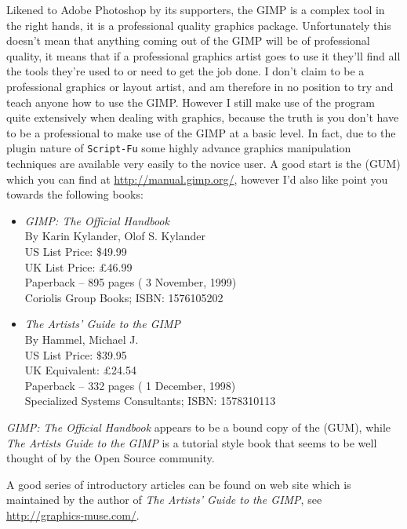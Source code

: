 \documentclass[twoside,11pt]{starlink}
\begin{document}
Likened to Adobe Photoshop by its supporters, the GIMP is a complex
tool in the right hands, it is a professional quality graphics
package. Unfortunately this doesn't mean that anything coming out of
the GIMP will be of professional quality, it means that if a
professional graphics artist goes to use it they'll find all the tools
they're used to or need to get the job done. I don't claim to be a
professional graphics or layout artist, and am therefore in no
position to try and teach anyone how to use the GIMP. However I still
make use of the program quite extensively when dealing with graphics,
because the truth is you don't have to be a professional to make use
of the GIMP at a basic level. In fact, due to the plugin nature of
\texttt{Script-Fu} some highly advance graphics manipulation techniques
are available very easily to the novice user. A good start is the
 (GUM)
which you can find at \url{http://manual.gimp.org/}, however
I'd also like point you towards the following books:

\begin{itemize}
\item \emph{GIMP: The Official Handbook}\\
By Karin Kylander, Olof S. Kylander\\
US List Price: \$49.99\\
UK List Price: $\pounds$46.99\\
Paperback -- 895 pages ( 3 November, 1999)\\
Coriolis Group Books; ISBN: 1576105202

\item \emph{The Artists' Guide to the GIMP}\\
By Hammel, Michael J.\\
US List Price: \$39.95\\
UK Equivalent: $\pounds$24.54\\
Paperback -- 332 pages ( 1 December, 1998)\\
Specialized Systems Consultants; ISBN: 1578310113

\end{itemize}

\emph{GIMP: The Official Handbook} appears to be a bound copy of the
 (GUM),
while \emph{The Artists Guide to the GIMP} is a tutorial style book
that seems to be well thought of by the Open Source community.

A good series of introductory articles can be found on
web site which is maintained by the author of \emph{The Artists' Guide
to the GIMP}, see \url{http://graphics-muse.com/}.
\end{document}
